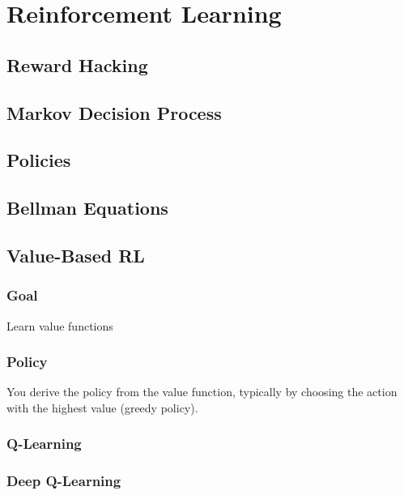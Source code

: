 \documentclass{article}
\begin{document}
\clearpage\newpage

\section{Reinforcement Learning}

\subsection{Reward Hacking}

\subsection{Markov Decision Process}

\subsection{Policies}

\subsection{Bellman Equations}

\subsection{Value-Based RL}

\subsubsection{Goal} Learn value functions

\subsubsection{Policy} You derive the policy from the value function, typically by choosing the action with the highest value (greedy policy).

\subsubsection{Q-Learning}

\subsubsection{Deep Q-Learning}
\end{document}
